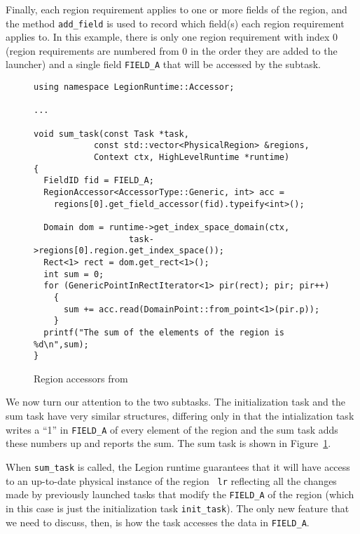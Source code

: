 Finally, each region requirement applies to one or more fields of the region, and the method {\tt add\_field} is
used to record which field(s) each region requirement applies to.
In this example, there is only one region requirement with index 0 (region requirements
are numbered from 0 in the order they are added to the launcher) and a single field {\tt FIELD\_A} that will be
accessed by the subtask.

\begin{figure}
{\small
\begin{lstlisting}
using namespace LegionRuntime::Accessor;

...

void sum_task(const Task *task,
		    const std::vector<PhysicalRegion> &regions,
		    Context ctx, HighLevelRuntime *runtime)
{
  FieldID fid = FIELD_A;
  RegionAccessor<AccessorType::Generic, int> acc =
    regions[0].get_field_accessor(fid).typeify<int>();

  Domain dom = runtime->get_index_space_domain(ctx,
                   task->regions[0].region.get_index_space());
  Rect<1> rect = dom.get_rect<1>();
  int sum = 0;
  for (GenericPointInRectIterator<1> pir(rect); pir; pir++)
    {
      sum += acc.read(DomainPoint::from_point<1>(pir.p));
    }
  printf("The sum of the elements of the region is %d\n",sum);
}
\end{lstlisting}
}
\caption{Region accessors from }
\label{fig:accessors}
\end{figure}
We now turn our attention to the two subtasks.  The initialization task and the sum task have very similar
structures, differing only in that the intialization task writes a ``1'' in {\tt FIELD\_A} of every element of the region and
the sum task adds these numbers up and reports the sum.  The sum task is shown in Figure~\ref{fig:accessors}.

When {\tt sum\_task} is called, the Legion runtime guarantees that it
will have access to an up-to-date physical instance of the region {\tt
  lr} reflecting all the changes made by previously launched tasks
that modify the {\tt FIELD\_A} of the region (which in this case is
just the initialization task {\tt init\_task}).  The only new feature
that we need to discuss, then, is how the task accesses the data in {\tt FIELD\_A}.

